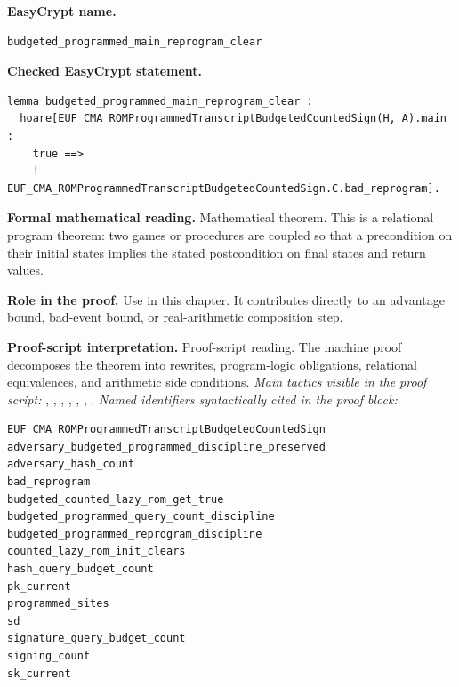 \begin{formaltheorem}
\end{formaltheorem}

\begin{formaltheorem}
\noindent\textbf{EasyCrypt name.}
\begin{lstlisting}[language=EasyCrypt,basicstyle=\ttfamily\scriptsize]
budgeted_programmed_main_reprogram_clear
\end{lstlisting}
\noindent\textbf{Checked EasyCrypt statement.}
\begin{lstlisting}[language=EasyCrypt,basicstyle=\ttfamily\scriptsize]
lemma budgeted_programmed_main_reprogram_clear :
  hoare[EUF_CMA_ROMProgrammedTranscriptBudgetedCountedSign(H, A).main :
    true ==>
    ! EUF_CMA_ROMProgrammedTranscriptBudgetedCountedSign.C.bad_reprogram].
\end{lstlisting}
\noindent\textbf{Formal mathematical reading.}
Mathematical theorem. This is a relational program theorem: two games or procedures are coupled so that a precondition on their initial states implies the stated postcondition on final states and return values.

\noindent\textbf{Role in the proof.}
Use in this chapter. It contributes directly to an advantage bound, bad-event bound, or real-arithmetic composition step.

\noindent\textbf{Proof-script interpretation.}
Proof-script reading. The machine proof decomposes the theorem into rewrites, program-logic obligations, relational equivalences, and arithmetic side conditions.
\emph{Main tactics visible in the proof script:} , , , , , , .
\emph{Named identifiers syntactically cited in the proof block:}
\begin{lstlisting}[language=EasyCrypt,basicstyle=\ttfamily\scriptsize]
EUF_CMA_ROMProgrammedTranscriptBudgetedCountedSign
adversary_budgeted_programmed_discipline_preserved
adversary_hash_count
bad_reprogram
budgeted_counted_lazy_rom_get_true
budgeted_programmed_query_count_discipline
budgeted_programmed_reprogram_discipline
counted_lazy_rom_init_clears
hash_query_budget_count
pk_current
programmed_sites
sd
signature_query_budget_count
signing_count
sk_current
\end{lstlisting}

\end{formaltheorem}

